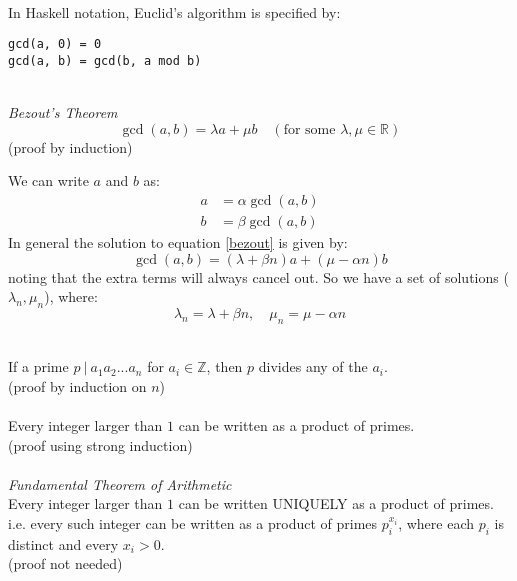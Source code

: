\documentclass{scrartcl}
\newcommand{\R}{\mathbb{R}}
\newcommand{\Z}{\mathbb{Z}}
\begin{document}
\\
\begin{tcolorbox}[breakable]
In Haskell notation, Euclid's algorithm is specified by:
\begin{verbatim}
gcd(a, 0) = 0
gcd(a, b) = gcd(b, a mod b)
\end{verbatim}
\end{tcolorbox}
\noindent
\\
\textit{Bezout's Theorem}
\begin{equation} \label{bezout}
\gcd(a, b) = \lambda a + \mu b \quad (\textrm{for some } \lambda, \mu \in \R)
\end{equation}
(proof by induction)
\\
\begin{tcolorbox}[breakable]
We can write $ a $ and $ b $ as:
\begin{align}
a & = \alpha \gcd(a, b) \\
b & = \beta \gcd(a, b)
\end{align}
In general the solution to equation \ref{bezout} is given by:
\begin{equation}
\gcd(a, b) = (\lambda + \beta n) a + (\mu - \alpha n) b
\end{equation}
noting that the extra terms will always cancel out. So we have a set of solutions ($ \lambda_{n}, \mu_{n} $), where:
\begin{equation}
\lambda_{n} = \lambda + \beta n, \quad \mu_{n} = \mu - \alpha n
\end{equation}
\end{tcolorbox}
\noindent
\\
If a prime $ p \ | \ a_{1} a_{2} \textrm{...} a_{n} $ for $ a_{i} \in \Z $, then $ p $ divides any of the $ a_{i} $.
\\
(proof by induction on $ n $)
\\\\
Every integer larger than $ 1 $ can be written as a product of primes.
\\
(proof using strong induction)
\\\\
\textit{Fundamental Theorem of Arithmetic}
\\
Every integer larger than $ 1 $ can be written UNIQUELY as a product of primes.
\\
i.e. every such integer can be written as a product of primes $ p_{i}^{x_{i}} $, where each $ p_{i} $ is distinct and every $ x_{i} > 0 $.
\\
(proof not needed)
\end{document}
